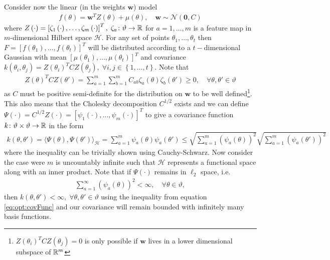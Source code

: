 Consider now the linear (in the weights $\mathbf{w}$) model
\begin{align}
\label{eq:opt:linModel}
f \left(\theta\right) = \mathbf{w}^T Z \left(\theta\right)  + \mu\left(\theta\right), \quad \mathbf{w} \sim \mathcal{N} \left(\mathbf{0}, C\right)
\end{align}
where $Z\left(\cdot\right) = \left[\zeta_1\left(\cdot\right),\dots,\zeta_m\left(\cdot\right)\right]^T, \; \zeta_a \colon \vartheta \rightarrow \mathbb{R}$ for $a = 1,\dots,m$ is a feature map in $m$-dimensional Hilbert space $\mathcal{H}$.  For any set of points $\theta_1,\dots,\theta_t$ then $F = \left[f\left(\theta_1\right),\dots,f\left(\theta_t\right)\right]^T$ will be distributed according to a $t-$dimensional Gaussian with mean $\left[\mu\left(\theta_1\right),\dots,\mu\left(\theta_t\right)\right]^T$ and covariance $k\left(\theta_i,\theta_j\right) = Z\left(\theta_i\right)^T C Z\left(\theta_j\right), \; \forall i,j \in \left\{1,\dots,t\right\}$.  Note that 
\begin{align}
\label{eq:opt:poskernel}
Z\left(\theta\right)^T C Z\left(\theta'\right) = \sum_{a=1}^{m} \sum_{b=1}^{m} C_{ab}\zeta_a\left(\theta\right)\zeta_b\left(\theta'\right) \ge 0, \quad \forall \theta, \theta' \in \vartheta
\end{align}
as $C$ must be positive semi-definite for the distribution on $\mathbf{w}$ to be well defined\footnote{$Z\left(\theta_i\right)^T C Z\left(\theta_j\right)=0$ is only possible if $\mathbf{w}$ lives in a lower dimensional subspace of $\mathbb{R}^m$}.  This also means that the Cholesky decomposition $C^{1/2}$ exists and we can define $\Psi\left(\cdot\right) = C^{1/2} Z\left(\cdot\right) = \left[\psi_1\left(\cdot\right),\dots,\psi_m\left(\cdot\right)\right]^T$ to give a covariance function $k \colon \vartheta \times \vartheta \rightarrow \mathbb{R}$ in the form
\begin{align}
\label{eq:opt:covFunc}
k\left(\theta,\theta'\right) = \langle\Psi\left(\theta\right), \Psi\left(\theta'\right)\rangle_{\mathcal{H}} = \sum_{a=1}^{m} \psi_a\left(\theta\right) \psi_a\left(\theta'\right) \le \sqrt{\sum_{a=1}^{m} \left(\psi_a\left(\theta\right)\right)^2} \sqrt{\sum_{a=1}^{m} \left(\psi_a\left(\theta'\right)\right)^2}
\end{align}
where the inequality can be trivially shown using Cauchy-Schwarz.  Now consider the case were $m$ is uncountably infinite such that $\mathcal{H}$ represents a functional space along with an inner product.  Note that if $\Psi \left(\cdot\right)$ remains in $\ell_2$ space, i.e.
\begin{align}
\label{eq:opt:l2Space}
\sum_{a=1}^{\infty} \left(\psi_a\left(\theta\right)\right)^2 < \infty, \quad \forall \theta \in \vartheta,
\end{align}
then $k\left(\theta,\theta'\right) < \infty, \; \forall \theta, \theta' \in \vartheta$ using the inequality from equation \eqref{eq:opt:covFunc} and our covariance will remain bounded with infinitely many basis functions.


